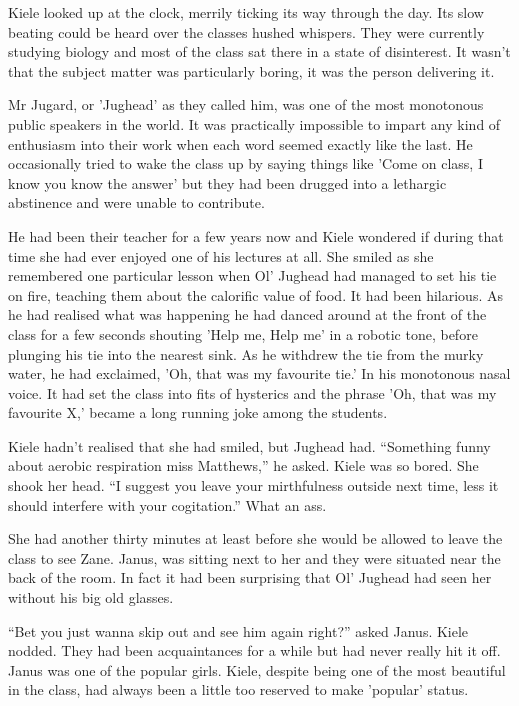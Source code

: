 Kiele looked up at the clock, merrily ticking its way through the day.  Its slow beating could be heard over the classes hushed whispers.  They were currently studying biology and most of the class sat there in a state of disinterest.  It wasn't that the subject matter was particularly boring, it was the person delivering it.  

Mr Jugard, or 'Jughead' as they called him, was one of the most monotonous public speakers in the world.  It was practically impossible to impart any kind of enthusiasm into their work when each word seemed exactly like the last.  He occasionally tried to wake the class up by saying things like 'Come on class, I know you know the answer' but they had been drugged into a lethargic abstinence and were unable to contribute.

He had been their teacher for a few years now and Kiele wondered if during that time she had ever enjoyed one of his lectures at all.  She smiled as she remembered one particular lesson when Ol' Jughead had managed to set his tie on fire, teaching them about the calorific value of food.  It had been hilarious.  As he had realised what was happening he had danced around at the front of the class for a few seconds shouting 'Help me, Help me' in a robotic tone, before plunging his tie into the nearest sink.  As he withdrew the tie from the murky water, he had exclaimed, 'Oh, that was my favourite tie.'  In his monotonous nasal voice.  It had set the class into fits of hysterics and the phrase 'Oh, that was my favourite X,' became a long running joke among the students.  

Kiele hadn't realised that she had smiled, but Jughead had.  ``Something funny about aerobic respiration miss Matthews,'' he asked.  Kiele was so bored.  She shook her head.  ``I suggest you leave your mirthfulness outside next time, less it should interfere with your cogitation.''  What an ass.

She had another thirty minutes at least before she would be allowed to leave the class to see Zane.  Janus, was sitting next to her and they were situated near the back of the room.  In fact it had been surprising that Ol' Jughead had seen her without his big old glasses.  

``Bet you just wanna skip out and see him again right?'' asked Janus.  Kiele nodded.  They had been acquaintances for a while but had never really hit it off.  Janus was one of the popular girls.  Kiele, despite being one of the most beautiful in the class, had always been a little too reserved to make 'popular' status.

